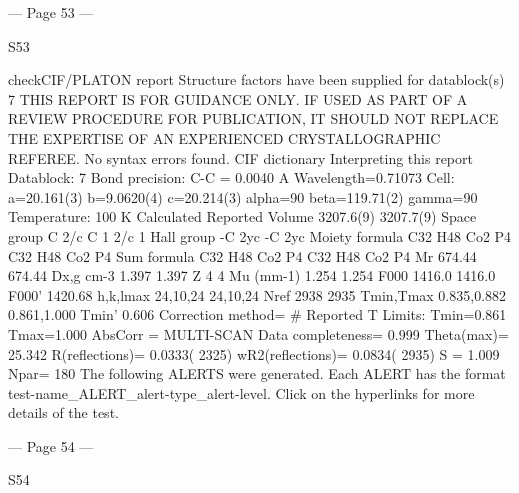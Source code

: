 --- Page 53 ---
 
 
S53 
 
 
 
checkCIF/PLATON report 
Structure factors have been supplied for datablock(s) 7
THIS REPORT IS FOR GUIDANCE ONLY. IF USED AS PART OF A REVIEW PROCEDURE
FOR PUBLICATION, IT SHOULD NOT REPLACE THE EXPERTISE OF AN EXPERIENCED
CRYSTALLOGRAPHIC REFEREE.
No syntax errors found.        CIF dictionary        Interpreting this report
Datablock: 7 
Bond precision:
C-C = 0.0040 A
Wavelength=0.71073
Cell:
a=20.161(3)
b=9.0620(4)
c=20.214(3)
alpha=90
beta=119.71(2)
gamma=90
Temperature: 
100 K
Calculated
Reported
Volume
3207.6(9)
3207.7(9)
Space group
C 2/c 
C 1 2/c 1 
Hall group
-C 2yc 
-C 2yc 
Moiety formula
C32 H48 Co2 P4
C32 H48 Co2 P4
Sum formula
C32 H48 Co2 P4
C32 H48 Co2 P4
Mr
674.44
674.44
Dx,g cm-3
1.397
1.397
Z
4
4
Mu (mm-1)
1.254
1.254
F000
1416.0
1416.0
F000’
1420.68
h,k,lmax
24,10,24
24,10,24
Nref
2938 
2935 
Tmin,Tmax
0.835,0.882
0.861,1.000
Tmin’
0.606
Correction method= # Reported T Limits: Tmin=0.861 Tmax=1.000
AbsCorr = MULTI-SCAN
Data completeness= 0.999
Theta(max)= 25.342
R(reflections)= 0.0333( 2325)
wR2(reflections)= 0.0834( 2935)
S = 1.009
Npar= 180
The following ALERTS were generated. Each ALERT has the format
       test-name_ALERT_alert-type_alert-level.
Click on the hyperlinks for more details of the test.


--- Page 54 ---
 
 
S54 
 
 
 
